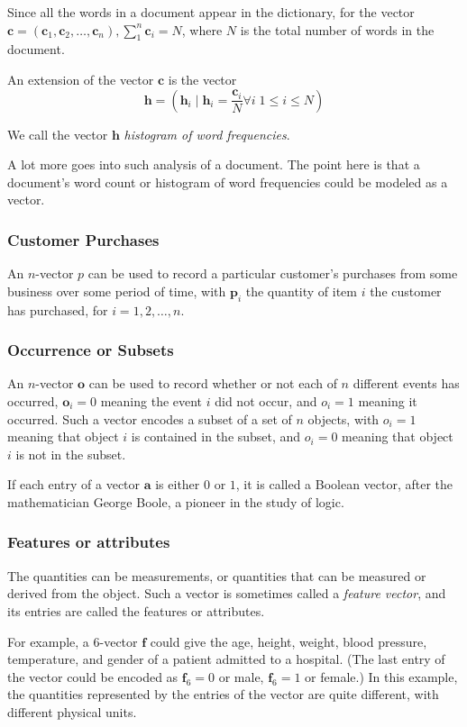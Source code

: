 \documentclass[11pt]{book}
\theoremstyle{definition}
\theoremstyle{plain}
\theoremstyle{problemstyle}
\theoremstyle{remark}
\theoremstyle{definition}
\begin{document}
Since all the words in a document appear in the dictionary, for the vector $\boldsymbol{c}=(\boldsymbol{c}_1,\boldsymbol{c}_2,\dots,\boldsymbol{c}_n),\sum_1^{n}\boldsymbol{c}_i=N$, where $N$ is the total number of words in the document.

An extension of the vector $\boldsymbol{c}$ is the vector 
\[
\boldsymbol{h}=(\boldsymbol{h}_i\mid\boldsymbol{h}_i=\frac{\boldsymbol{c}_i}{N}\forall i\;1\leq i\leq N)
\]

We call the vector $\boldsymbol{h}$ \emph{histogram of word frequencies}.

A lot more goes into such analysis of a document. The point here is that a document's word count or histogram of word frequencies could be modeled as a vector.

\subsubsection*{Customer Purchases}
An $n$-vector $p$ can be used to record a particular customer's purchases from some business over some period of time, with $\boldsymbol{p}_i$ the quantity of item $i$ the customer has purchased, for $i=1,2,\dots,n$.

\subsubsection*{Occurrence or Subsets}
An $n$-vector $\boldsymbol{o}$ can be used to record whether or not each of $n$ different events has occurred, $\boldsymbol{o}_i=0$ meaning the event $i$ did not occur, and $o_i=1$ meaning it occurred. Such a vector encodes a subset of a set of $n$ objects, with $o_i=1$ meaning that object $i$ is contained in the subset, and $o_i=0$ meaning that object $i$ is not in the subset. 

If each entry of a vector $\boldsymbol{a}$ is either $0$ or $1$, it is called a Boolean vector, after the mathematician George Boole, a pioneer in the study of logic.

\subsubsection*{Features or attributes}

The quantities can be measurements, or quantities that can be measured or derived from the object. Such a vector is sometimes called a \emph{feature vector}, and its entries are called the features or attributes. 

For example, a $6$-vector $\boldsymbol{f}$ could give the age, height, weight, blood pressure, temperature, and gender of a patient admitted to a hospital. (The last entry of the vector could be encoded as $\boldsymbol{f}_6=0$ or male, $\boldsymbol{f}_6=1$ or female.) In this example, the quantities represented by the entries of the vector are quite different, with different physical units.
\end{document}
